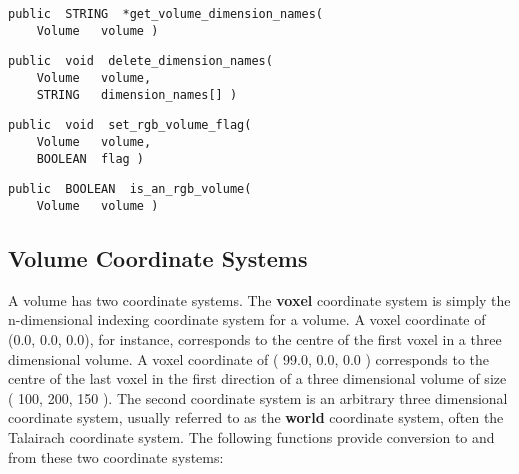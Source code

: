 
{\bf\begin{verbatim}
public  STRING  *get_volume_dimension_names(
    Volume   volume )
\end{verbatim}}


{\bf\begin{verbatim}
public  void  delete_dimension_names(
    Volume   volume,
    STRING   dimension_names[] )
\end{verbatim}}


{\bf\begin{verbatim}
public  void  set_rgb_volume_flag(
    Volume   volume,
    BOOLEAN  flag )
\end{verbatim}}


{\bf\begin{verbatim}
public  BOOLEAN  is_an_rgb_volume(
    Volume   volume )
\end{verbatim}}


\subsection{Volume Coordinate Systems}

A volume has two coordinate systems.  The {\bf voxel} coordinate
system is simply the n-dimensional indexing coordinate system for a
volume.  A voxel coordinate of (0.0, 0.0, 0.0), for instance, corresponds
to the centre of the first voxel in a three dimensional volume.  A voxel
coordinate of ( 99.0, 0.0, 0.0 ) corresponds to the centre of the last
voxel in the first direction of a three dimensional volume of size (
100, 200, 150 ).  The second coordinate system is an arbitrary
three dimensional coordinate system, usually referred to as the
{\bf world} coordinate system, often
the Talairach coordinate system.  The following functions provide
conversion to and from these two coordinate systems:

